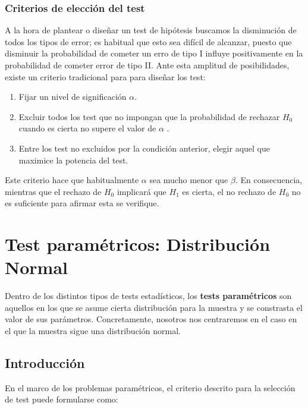 \documentclass[a4paper,12pt]{article}
\begin{document}
\subsubsection{Criterios de elección del test}
    A la hora de plantear o diseñar un test de hipótesis buscamos la disminución de todos los tipos de error; es habitual que esto sea difícil de alcanzar, puesto que disminuir la probabilidad de cometer un erro de tipo I influye positivamente en la probabilidad de cometer error de tipo II. Ante esta amplitud de posibilidades, existe un criterio tradicional para para diseñar los test:
\begin{enumerate}
	\item Fijar un nivel de significación $\alpha$.
	\item Excluir todos los test que no impongan que la probabilidad de rechazar $H_0$ cuando es cierta no supere el valor de $\alpha$ . 
	\item  Entre los test no excluidos por la condición anterior, elegir aquel que maximice la potencia del test.
\end{enumerate}

    Este criterio hace que habitualmente $\alpha$ sea mucho menor que $\beta$. 
    En consecuencia, mientras que el rechazo de $H_0$ implicará que $H_1$ es cierta, el no rechazo de $H_0$ no es suficiente para afirmar esta se verifique.


\section{Test paramétricos: Distribución Normal}

     Dentro de los distintos tipos de tests estadísticos, los \textbf{tests paramétricos} son aquellos en los que se asume cierta distribución para la muestra y se constrasta el valor de sus parámetros.
     Concretamente, nosotros nos centraremos en el caso en el que la muestra sigue una distribución normal.
     
\subsection{Introducción}
En el marco de los problemas paramétricos, el criterio descrito para la selección de test puede formularse como:
\end{document}
